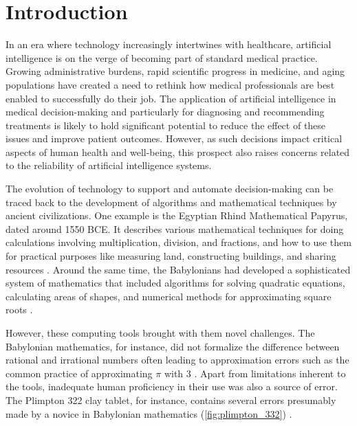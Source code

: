 
\chapter[introduction]{Introduction}\label{chp:introduction}
%
%

In an era where technology increasingly intertwines with healthcare, artificial intelligence is on the verge of becoming part of standard medical practice. 
Growing administrative burdens, rapid scientific progress in medicine, and aging populations have created a need to rethink how medical professionals are best enabled to successfully do their job. 
The application of artificial intelligence in medical decision-making and particularly for diagnosing and recommending treatments is likely to hold significant potential to reduce the effect of these issues and improve patient outcomes. 
However, as such decisions impact critical aspects of human health and well-being, this prospect also raises concerns related to the reliability of artificial intelligence systems.

The evolution of technology to support and automate decision-making can be traced back to the development of algorithms and mathematical techniques by ancient civilizations. 
One example is the Egyptian Rhind Mathematical Papyrus, dated around 1550 BCE. It describes various mathematical techniques for doing calculations involving multiplication, division, and fractions, and how to use them for practical purposes like measuring land, constructing buildings, and sharing resources \cite{georges_universal_2001}. 
Around the same time, the Babylonians had developed a sophisticated system of mathematics that included algorithms for solving quadratic equations, calculating areas of shapes, and numerical methods for approximating square roots \cite{fowler_square_1998}. 

However, these computing tools brought with them novel challenges. The Babylonian mathematics, for instance, did not formalize the difference between rational and irrational numbers often leading to approximation errors such as the common practice of approximating $\pi$ with 3 \cite{georges_universal_2001}. Apart from limitations inherent to the tools, inadequate human proficiency in their use was also a source of error. The Plimpton 322 clay tablet, for instance, contains several errors presumably made by a novice in Babylonian mathematics (\cref{fig:plimpton_332}) \cite{britton_plimpton_2011}. 

